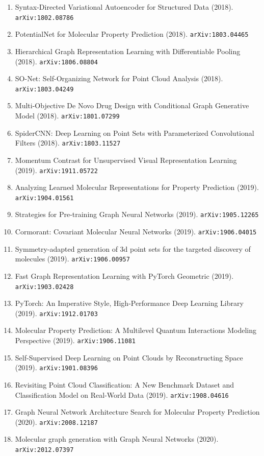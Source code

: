 \documentclass[11pt]{article}
\begin{document}
\begin{enumerate}
  \item Syntax-Directed Variational Autoencoder for Structured Data (2018). \texttt{arXiv:1802.08786}
  \item PotentialNet for Molecular Property Prediction (2018). \texttt{arXiv:1803.04465}
  \item Hierarchical Graph Representation Learning with Differentiable Pooling (2018). \texttt{arXiv:1806.08804}
  \item SO-Net: Self-Organizing Network for Point Cloud Analysis (2018). \texttt{arXiv:1803.04249}
  \item Multi-Objective De Novo Drug Design with Conditional Graph Generative
  Model (2018). \texttt{arXiv:1801.07299}
  \item SpiderCNN: Deep Learning on Point Sets with Parameterized Convolutional
  Filters (2018). \texttt{arXiv:1803.11527}
  \item Momentum Contrast for Unsupervised Visual Representation Learning (2019). \texttt{arXiv:1911.05722}
  \item Analyzing Learned Molecular Representations for Property Prediction (2019). \texttt{arXiv:1904.01561}
  \item Strategies for Pre-training Graph Neural Networks (2019). \texttt{arXiv:1905.12265}
  \item Cormorant: Covariant Molecular Neural Networks (2019). \texttt{arXiv:1906.04015}
  \item Symmetry-adapted generation of 3d point sets for the targeted discovery
  of molecules (2019). \texttt{arXiv:1906.00957}
  \item Fast Graph Representation Learning with PyTorch Geometric (2019). \texttt{arXiv:1903.02428}
  \item PyTorch: An Imperative Style, High-Performance Deep Learning Library (2019). \texttt{arXiv:1912.01703}
  \item Molecular Property Prediction: A Multilevel Quantum Interactions
  Modeling Perspective (2019). \texttt{arXiv:1906.11081}
  \item Self-Supervised Deep Learning on Point Clouds by Reconstructing Space (2019). \texttt{arXiv:1901.08396}
  \item Revisiting Point Cloud Classification: A New Benchmark Dataset and
  Classification Model on Real-World Data (2019). \texttt{arXiv:1908.04616}
  \item Graph Neural Network Architecture Search for Molecular Property
  Prediction (2020). \texttt{arXiv:2008.12187}
  \item Molecular graph generation with Graph Neural Networks (2020). \texttt{arXiv:2012.07397}

\end{enumerate}
\end{document}
